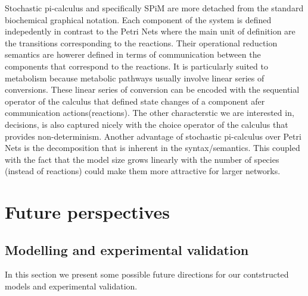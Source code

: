 Stochastic pi-calculus and specifically SPiM are more detached from
the standard biochemical graphical notation. Each component of the
system is defined indepedently in contrast to the Petri Nets where the
main unit of definition are the transitions corresponding to the
reactions. Their operational reduction semantics are howerer defined in terms
of communication between the components that correspond to the
reactions. It is particularly suited to metabolism because metabolic
pathways usually involve linear series of conversions. These linear
series of conversion can be encoded with the sequential operator of
the calculus that defined state changes of a component afer
communication actions(reactions). The other characterstic we are
interested in, decisions, is also captured nicely with the choice
operator of the calculus that provides non-determinism. Another
advantage of stochastic pi-calculus over Petri Nets is the
decomposition that is inherent in the syntax/semantics. This coupled
with the fact that the model size grows linearly with the number of
species (instead of reactions) could make them more attractive for
larger networks.



\section{Future perspectives}

\subsection{Modelling and experimental validation}
In this section we present some possible future directions for our
contstructed models and experimental validation.

